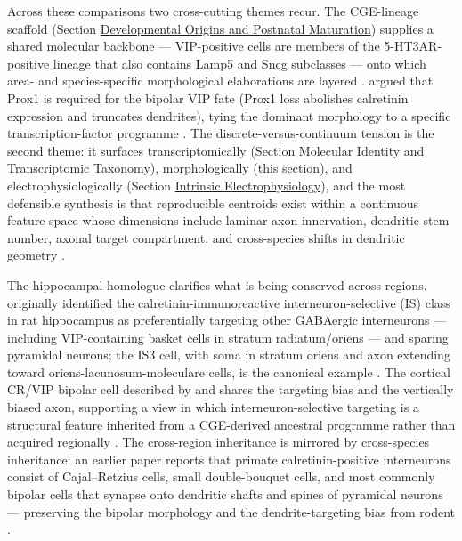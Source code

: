 \documentclass[11pt]{article}
\begin{document}
Across these comparisons two cross-cutting themes recur. The CGE-lineage scaffold (Section \href{/development}{Developmental Origins and Postnatal Maturation}) supplies a shared molecular backbone --- VIP-positive cells are members of the 5-HT3AR-positive lineage that also contains Lamp5 and Sncg subclasses --- onto which area- and species-specific morphological elaborations are layered \citep{Vucurovic2010, Fishell2020, Wong2022, Hodge2019}. \citet{Fishell2020} argued that Prox1 is required for the bipolar VIP fate (Prox1 loss abolishes calretinin expression and truncates dendrites), tying the dominant morphology to a specific transcription-factor programme \citep{Fishell2020, Stachniak2021, Wong2022, Demarcogarcia2011}. The discrete-versus-continuum tension is the second theme: it surfaces transcriptomically (Section \href{/classification}{Molecular Identity and Transcriptomic Taxonomy}), morphologically (this section), and electrophysiologically (Section \href{/electrophysiology}{Intrinsic Electrophysiology}), and the most defensible synthesis is that reproducible centroids exist within a continuous feature space whose dimensions include laminar axon innervation, dendritic stem number, axonal target compartment, and cross-species shifts in dendritic geometry \citep{Gouwens2020a, Gouwens2020b, Gliko2024, Chartrand2023}.

The hippocampal homologue clarifies what is being conserved across regions. \citet{Gulyas1996} originally identified the calretinin-immunoreactive interneuron-selective (IS) class in rat hippocampus as preferentially targeting other GABAergic interneurons --- including VIP-containing basket cells in stratum radiatum/oriens --- and sparing pyramidal neurons; the IS3 cell, with soma in stratum oriens and axon extending toward oriens-lacunosum-moleculare cells, is the canonical example \citep{Gulyas1996, Cauli2014, Lee2013, Stachniak2021}. The cortical CR/VIP bipolar cell described by \citet{Cauli1997} and \citet{Kawaguchi1996} shares the targeting bias and the vertically biased axon, supporting a view in which interneuron-selective targeting is a structural feature inherited from a CGE-derived ancestral programme rather than acquired regionally \citep{Cauli1997, Kawaguchi1996, Gulyas1996, Fishell2020}. The cross-region inheritance is mirrored by cross-species inheritance: an earlier paper reports that primate calretinin-positive interneurons consist of Cajal--Retzius cells, small double-bouquet cells, and most commonly bipolar cells that synapse onto dendritic shafts and spines of pyramidal neurons --- preserving the bipolar morphology and the dendrite-targeting bias from rodent \citep{Cauli2014, Hodge2019, Cauli1997}.
\end{document}
